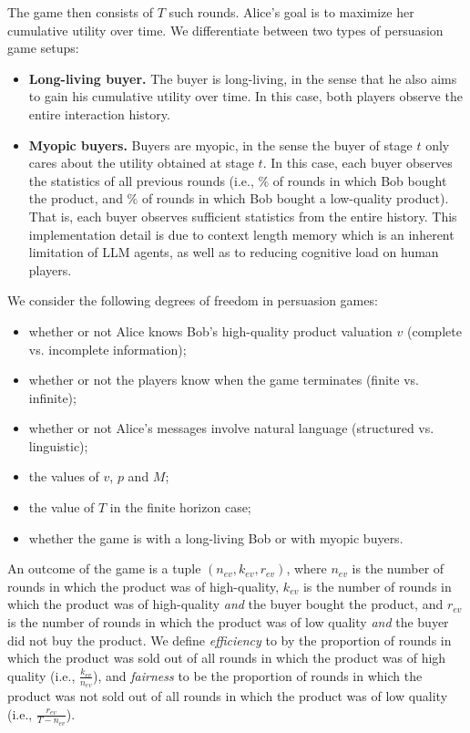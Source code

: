The game then consists of $T$ such rounds. Alice's goal is to maximize her cumulative utility over time. We differentiate between two types of persuasion game setups:

\begin{itemize}
    \item[(a)] \textbf{Long-living buyer.} The buyer is long-living, in the sense that he also aims to gain his cumulative utility over time. In this case, both players observe the entire interaction history.
    \item[(b)] \textbf{Myopic buyers.} Buyers are myopic, in the sense the buyer of stage $t$ only cares about the utility obtained at stage $t$. In this case, each buyer observes the statistics of all previous rounds (i.e., $\%$ of rounds in which Bob bought the product, and $\%$ of rounds in which Bob bought a low-quality product). That is, each buyer observes sufficient statistics from the entire history. This implementation detail is due to context length memory which is an inherent limitation of LLM agents, as well as to reducing cognitive load on human players.
\end{itemize}

We consider the following degrees of freedom in persuasion games: 

\begin{itemize}
    \item[(i)] whether or not Alice knows Bob's high-quality product valuation $v$ (complete vs. incomplete information);
    \item[(ii)] whether or not the players know when the game terminates (finite vs. infinite);
    \item[(iii)] whether or not Alice's messages involve natural language (structured vs. linguistic);
    \item[(iv)] the values of $v$, $p$ and $M$;
    \item[(v)] the value of $T$ in the finite horizon case;
    \item[(vi)] whether the game is with a long-living Bob or with myopic buyers. 
\end{itemize}


An outcome of the game is a tuple $(n_{ev}, k_{ev}, r_{ev})$, where $n_{ev}$ is the number of rounds in which the product was of high-quality, $k_{ev}$ is the number of rounds in which the product was of high-quality \emph{and} the buyer bought the product, and $r_{ev}$ is the number of rounds in which the product was of low quality \emph{and} the buyer did not buy the product. We define \emph{efficiency} to by the proportion of rounds in which the product was sold out of all rounds in which the product was of high quality (i.e., $\frac{k_{ev}}{n_{ev}}$), and \emph{fairness} to be the proportion of rounds in which the product was not sold out of all rounds in which the product was of low quality (i.e., $\frac{r_{ev}}{T-n_{ev}}$).

